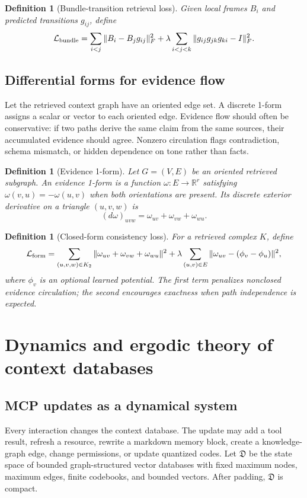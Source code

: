 \documentclass[11pt]{article}
\newtheorem{definition}[theorem]{Definition}
\newcommand{\RR}{\mathbb{R}}
\newcommand{\loss}{\mathcal{L}}
\numberwithin{equation}{section}
\begin{document}
\begin{definition}[Bundle-transition retrieval loss]
Given local frames $B_i$ and predicted transitions $g_{ij}$, define
\begin{equation}
\loss_{\rm bundle}=\sum_{i<j}\|B_i-B_jg_{ij}\|_F^2+\lambda\sum_{i<j<k}\|g_{ij}g_{jk}g_{ki}-I\|_F^2.
\end{equation}
\end{definition}

\subsection{Differential forms for evidence flow}
Let the retrieved context graph have an oriented edge set. A discrete 1-form assigns a scalar or vector to each oriented edge. Evidence flow should often be conservative: if two paths derive the same claim from the same sources, their accumulated evidence should agree. Nonzero circulation flags contradiction, schema mismatch, or hidden dependence on tone rather than facts.

\begin{definition}[Evidence 1-form]
Let $G=(V,E)$ be an oriented retrieved subgraph. An evidence 1-form is a function $\omega:E\to\RR^r$ satisfying $\omega(v,u)=-\omega(u,v)$ when both orientations are present. Its discrete exterior derivative on a triangle $(u,v,w)$ is
\begin{equation}
(d\omega)_{uvw}=\omega_{uv}+\omega_{vw}+\omega_{wu}.
\end{equation}
\end{definition}

\begin{definition}[Closed-form consistency loss]
For a retrieved complex $K$, define
\begin{equation}
\loss_{\rm form}=\sum_{(u,v,w)\in K_2}\|\omega_{uv}+\omega_{vw}+\omega_{wu}\|^2+\lambda\sum_{(u,v)\in E}\|\omega_{uv}-(\phi_v-\phi_u)\|^2,
\end{equation}
where $\phi_v$ is an optional learned potential. The first term penalizes nonclosed evidence circulation; the second encourages exactness when path independence is expected.
\end{definition}

\section{Dynamics and ergodic theory of context databases}
\subsection{MCP updates as a dynamical system}
Every interaction changes the context database. The update may add a tool result, refresh a resource, rewrite a markdown memory block, create a knowledge-graph edge, change permissions, or update quantized codes. Let $\mathfrak{D}$ be the state space of bounded graph-structured vector databases with fixed maximum nodes, maximum edges, finite codebooks, and bounded vectors. After padding, $\mathfrak{D}$ is compact.
\end{document}
